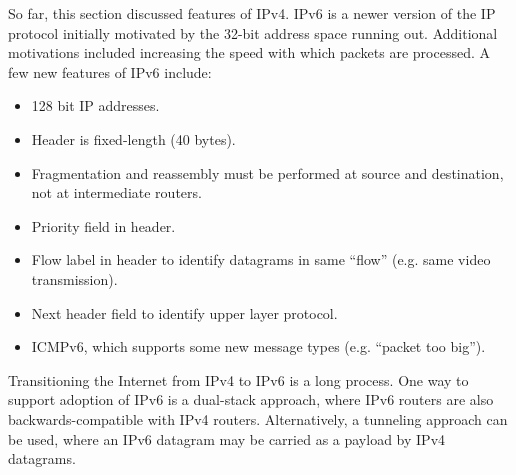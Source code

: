 \documentclass[12pt,titlepage]{article}
\begin{document}
        So far, this section discussed features of IPv4. IPv6 is a newer version of the IP protocol initially motivated by the 32-bit address space
        running out. Additional motivations included increasing the speed with which packets are processed. A few new features of IPv6 include:
        \begin{itemize}
          \item 128 bit IP addresses.
          \item Header is fixed-length (40 bytes).
          \item Fragmentation and reassembly must be performed at source and destination, not at intermediate routers.
          \item Priority field in header.
          \item Flow label in header to identify datagrams in same ``flow'' (e.g. same video transmission).
          \item Next header field to identify upper layer protocol.
          \item ICMPv6, which supports some new message types (e.g. ``packet too big'').
        \end{itemize}

        Transitioning the Internet from IPv4 to IPv6 is a long process. One way to support adoption of IPv6 is a dual-stack approach, where IPv6
        routers are also backwards-compatible with IPv4 routers. Alternatively, a tunneling approach can be used, where an IPv6 datagram may be
        carried as a payload by IPv4 datagrams.
\end{document}
